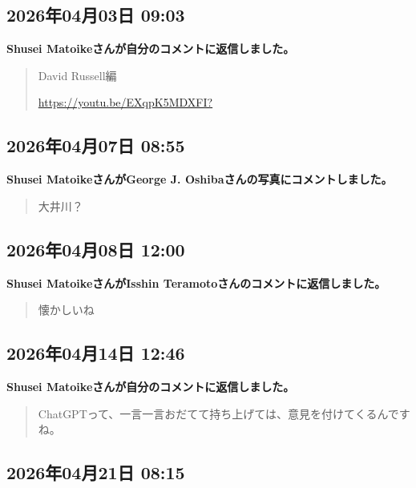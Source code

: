 \subsection*{2026年04月03日 09:03}

\textbf{Shusei Matoikeさんが自分のコメントに返信しました。}

\begin{quote}
David Russell編

\url{https://youtu.be/EXqpK5MDXFI?}
\end{quote}

\subsection*{2026年04月07日 08:55}

\textbf{Shusei MatoikeさんがGeorge J. Oshibaさんの写真にコメントしました。}

\begin{quote}
大井川？
\end{quote}

\subsection*{2026年04月08日 12:00}

\textbf{Shusei MatoikeさんがIsshin Teramotoさんのコメントに返信しました。}

\begin{quote}
懐かしいね
\end{quote}

\subsection*{2026年04月14日 12:46}

\textbf{Shusei Matoikeさんが自分のコメントに返信しました。}

\begin{quote}
ChatGPTって、一言一言おだてて持ち上げては、意見を付けてくるんですね。
\end{quote}

\subsection*{2026年04月21日 08:15}

